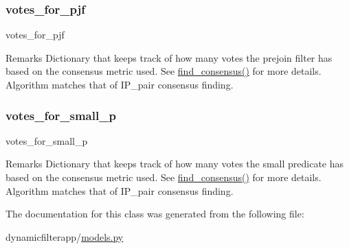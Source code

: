 \subsubsection{\texorpdfstring{votes\+\_\+for\+\_\+pjf}{votes\_for\_pjf}}
{\footnotesize\ttfamily votes\+\_\+for\+\_\+pjf}

\begin{DoxyRemark}{Remarks}
Dictionary that keeps track of how many votes the prejoin filter has based on the consensus metric used. See \hyperlink{classdynamicfilterapp_1_1models_1_1_join_a767745d0dad333b32a77be416c2bb117}{find\+\_\+consensus()} for more details. Algorithm matches that of I\+P\+\_\+pair consensus finding. 
\end{DoxyRemark}
\mbox{\label{classdynamicfilterapp_1_1models_1_1_join_a91816c1a011f3dfb47698f5313575446}} 
\subsubsection{\texorpdfstring{votes\+\_\+for\+\_\+small\+\_\+p}{votes\_for\_small\_p}}
{\footnotesize\ttfamily votes\+\_\+for\+\_\+small\+\_\+p}

\begin{DoxyRemark}{Remarks}
Dictionary that keeps track of how many votes the small predicate has based on the consensus metric used. See \hyperlink{classdynamicfilterapp_1_1models_1_1_join_a767745d0dad333b32a77be416c2bb117}{find\+\_\+consensus()} for more details. Algorithm matches that of I\+P\+\_\+pair consensus finding. 
\end{DoxyRemark}


The documentation for this class was generated from the following file\+:\begin{DoxyCompactItemize}
\item 
dynamicfilterapp/\hyperlink{models_8py}{models.\+py}\end{DoxyCompactItemize}
